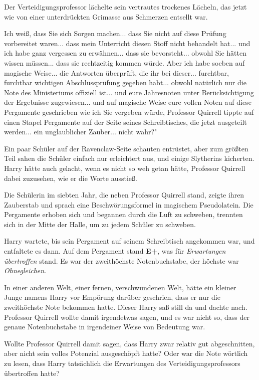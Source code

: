 Der Verteidigungsprofessor lächelte sein vertrautes trockenes Lächeln, das jetzt
wie von einer unterdrückten Grimasse aus Schmerzen entsellt war.

\glqq{}Ich weiß, dass Sie sich Sorgen machen... dass Sie nicht auf diese Prüfung
vorbereitet waren... dass mein Unterricht diesen Stoff nicht behandelt hat...
und ich habe ganz vergessen zu erwähnen... dass sie bevorsteht... obwohl Sie
hätten wissen müssen... dass sie rechtzeitig kommen würde. Aber ich habe soeben
auf magische Weise... die Antworten überprüft, die ihr bei dieser... furchtbar,
furchtbar wichtigen Abschlussprüfung gegeben habt... obwohl natürlich nur die
Note des Ministeriums offiziell ist... und eure Jahresnoten unter
Berücksichtigung der Ergebnisse zugewiesen... und auf magische Weise eure vollen
Noten auf diese Pergamente geschrieben wie ich Sie vergeben würde\grqq{},
Professor Quirrell tippte auf einen Stapel Pergamente auf der Seite seines
Schreibtisches, \glqq{}die jetzt ausgeteilt werden... ein unglaublicher Zauber...
nicht wahr?"

Ein paar Schüler auf der Ravenclaw-Seite schauten entrüstet, aber zum größten
Teil sahen die Schüler einfach nur erleichtert aus, und einige Slytherins
kicherten. Harry hätte auch gelacht, wenn es nicht so weh getan hätte, Professor
Quirrell dabei zuzusehen, wie er die Worte ausstieß.

Die Schülerin im siebten Jahr, die neben Professor Quirrell stand, zeigte ihren
Zauberstab und sprach eine Beschwörungsformel in magischem Pseudolatein. Die
Pergamente erhoben sich und begannen durch die Luft zu schweben, trennten sich
in der Mitte der Halle, um zu jedem Schüler zu schweben.

Harry wartete, bis sein Pergament auf seinem Schreibtisch angekommen war, und
entfaltete es dann. Auf dem Pergament stand \textbf{E+}, was für
\emph{Erwartungen übertroffen} stand. Es war der zweithöchste Notenbuchstabe,
der höchste war \emph{Ohnegleichen}.

In einer anderen Welt, einer fernen, verschwundenen Welt, hätte ein kleiner
Junge namens Harry vor Empörung darüber geschrien, dass er nur die zweithöchste
Note bekommen hatte. Dieser Harry saß still da und dachte nach. Professor
Quirrell wollte damit irgendetwas sagen, und es war nicht so, dass der genaue
Notenbuchstabe in irgendeiner Weise von Bedeutung war.

Wollte Professor Quirrell damit sagen, dass Harry zwar relativ gut
abgeschnitten, aber nicht sein volles Potenzial ausgeschöpft hatte? Oder war die
Note wörtlich zu lesen, dass Harry tatsächlich die Erwartungen des
Verteidigungsprofessors übertroffen hatte?


